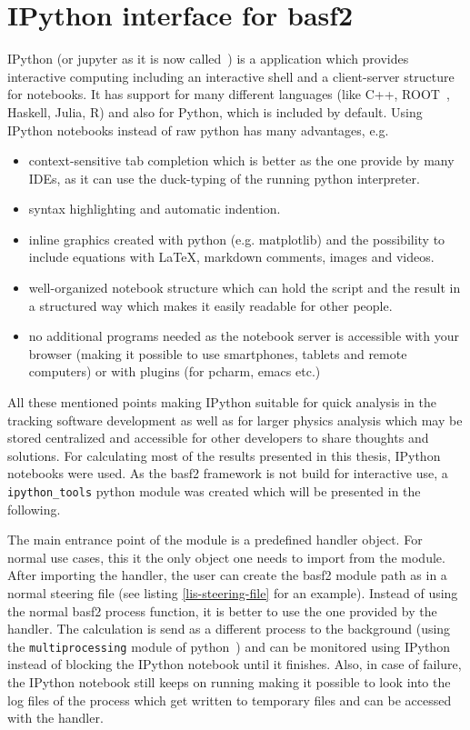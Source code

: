 \section{IPython interface for basf2}

IPython (or jupyter as it is now called~\cite{jupyter}) is a application which provides interactive computing including an interactive shell and a client-server structure for notebooks. It has support for many different languages (like C++, ROOT~\cite{root_ipython}, Haskell, Julia, R) and also for Python, which is included by default. Using IPython notebooks instead of raw python has many advantages, e.g.
\begin{itemize}
  \item context-sensitive tab completion which is better as the one provide by many IDEs, as it can use the duck-typing of the running python interpreter.
  \item syntax highlighting and automatic indention.
  \item inline graphics created with python (e.g. matplotlib) and the possibility to include equations with \LaTeX, markdown comments, images and videos.
  \item well-organized notebook structure which can hold the script and the result in a structured way which makes it easily readable for other people.
  \item no additional programs needed as the notebook server is accessible with your browser (making it possible to use smartphones, tablets and remote computers) or with plugins (for pcharm, emacs etc.)
\end{itemize}

All these mentioned points making IPython suitable for quick analysis in the tracking software development as well as for larger physics analysis which may be stored centralized and accessible for other developers to share thoughts and solutions. For calculating most of the results presented in this thesis, IPython notebooks were used. As the basf2 framework is not build for interactive use, a \texttt{ipython\_tools} python module was created which will be presented in the following.

The main entrance point of the module is a predefined handler object. For normal use cases, this it the only object one needs to import from the module. After importing the handler, the user can create the basf2 module path as in a normal steering file (see listing \ref{lis-steering-file} for an example). Instead of using the normal basf2 process function, it is better to use the one provided by the handler. The calculation is send as a different process to the background (using the \texttt{multiprocessing} module of python~\cite{multiprocessing}) and can be monitored using IPython instead of blocking the IPython notebook until it finishes. Also, in case of failure, the IPython notebook still keeps on running making it possible to look into the log files of the process which get written to temporary files and can be accessed with the handler.

